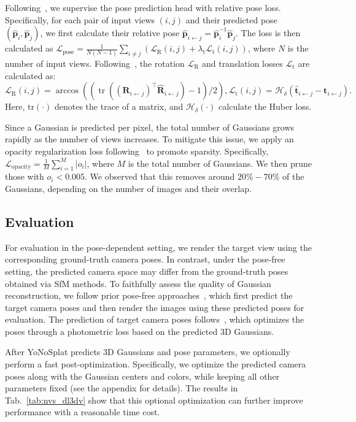 Following~\citep{pi3}, we supervise the pose prediction head with relative pose loss. Specifically, for each pair of input views $(i, j)$ and their predicted pose $(\hat{\mathbf{p}}_{i}, \hat{\mathbf{p}}_{j})$, we first calculate their relative pose $\hat{\mathbf{p}}_{i \leftarrow j} = \hat{\mathbf{p}}_{i}^{-1} \hat{\mathbf{p}}_{j}$.
The loss is then calculated as $\mathcal{L}_{\text{pose}}=\frac{1}{N(N-1)} \sum_{i \neq j} \left(\mathcal{L}_{\text{R}}(i, j) + \lambda_{\text{t}} \mathcal{L}_{\text{t}}(i, j)\right)$, where $N$ is the number of input views. Following~\citep{reloc3r, pi3}, the rotation $\mathcal{L}_{\text{R}}$ and translation losses $\mathcal{L}_{\text{t}}$ are calculated as:
\begin{equation}
    \mathcal{L}_{\text{R}}(i, j) = \arccos((\operatorname{tr}\left((\mathbf{R}_{i \leftarrow j})^\top \hat{\mathbf{R}}_{i \leftarrow j}\right) - 1) / 2),
    \mathcal{L}_{\text{t}}(i, j) = \mathcal{H}_{\delta}(\hat{\mathbf{t}}_{i \leftarrow j} - \mathbf{t}_{i \leftarrow j}).
\end{equation}
Here, $\operatorname{tr(\cdot)}$ denotes the trace of a matrix, and $ \mathcal{H}_{\delta}(\cdot)$ calculate the Huber loss.

Since a Gaussian is predicted per pixel, the total number of Gaussians grows rapidly as the number of views increases. To mitigate this issue, we apply an opacity regularization loss following~\citep{llrm} to promote sparsity. Specifically, $\mathcal{L}_{\text{opacity}} = \frac{1}{M} \sum_{i=1}^{M} |o_i|$, where $M$ is the total number of Gaussians. We then prune those with $o_i < 0.005$. We observed that this removes around $20\% - 70\%$ of the Gaussians, depending on the number of images and their overlap.


\vspace{-1mm}
\subsection{Evaluation} \label{sec:eval}
\vspace{-3mm}

For evaluation in the pose-dependent setting, we render the target view using the corresponding ground-truth camera poses.
In contrast, under the pose-free setting, the predicted camera space may differ from the ground-truth poses obtained via SfM methods.
To faithfully assess the quality of Gaussian reconstruction, we follow prior pose-free approaches~\citep{noposplat, nerfmm, instantsplat}, which first predict the target camera poses and then render the images using these predicted poses for evaluation.
The prediction of target camera poses follows~\citep{noposplat}, which optimizes the poses through a photometric loss based on the predicted 3D Gaussians.

After YoNoSplat predicts 3D Gaussians and pose parameters, we optionally perform a fast post-optimization. Specifically, we optimize the predicted camera poses along with the Gaussian centers and colors, while keeping all other parameters fixed (see the appendix for details). The results in Tab.~\ref{tab:nvs_dl3dv} show that this optional optimization can further improve performance with a reasonable time cost.
